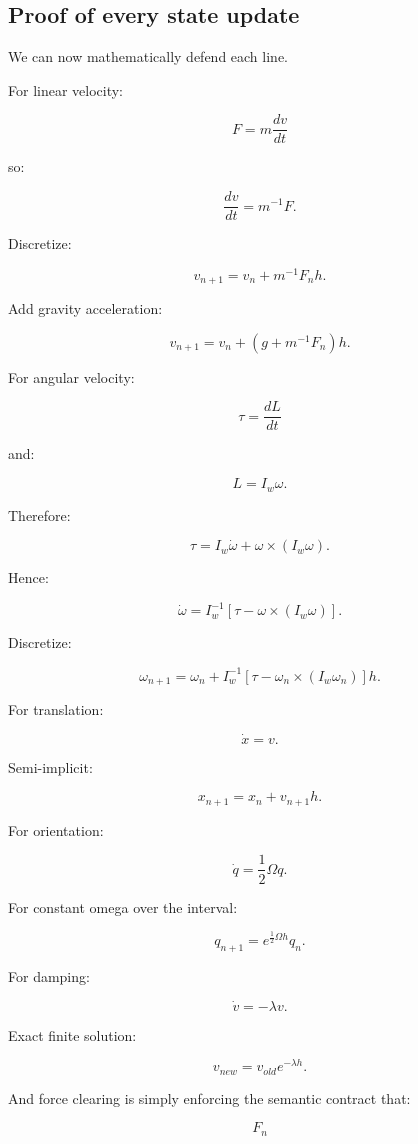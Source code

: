 \subsection{Proof of every state update}\label{06-engine-ii-ch039-proof-of-every-state-update}

We can now mathematically defend each line.

For linear velocity:

\[
F=m\frac{dv}{dt}
\]

so:

\[
\frac{dv}{dt}=m^{-1}F.
\]

Discretize:

\[
\boxed{
v_{n+1}
=
v_n+
m^{-1}F_nh.
}
\]

Add gravity acceleration:

\[
\boxed{
v_{n+1}
=
v_n+
(g+m^{-1}F_n)h.
}
\]

For angular velocity:

\[
\tau
=
\frac{dL}{dt}
\]

and:

\[
L=I_w\omega.
\]

Therefore:

\[
\tau
=
I_w\dot\omega+
\omega\times(I_w\omega).
\]

Hence:

\[
\boxed{
\dot\omega
=
I_w^{-1}
[
\tau-
\omega\times(I_w\omega)
].
}
\]

Discretize:

\[
\boxed{
\omega_{n+1}
=
\omega_n+
I_w^{-1}
[
\tau-
\omega_n\times(I_w\omega_n)
]h.
}
\]

For translation:

\[
\dot x=v.
\]

Semi-implicit:

\[
\boxed{
x_{n+1}
=
x_n+
v_{n+1}h.
}
\]

For orientation:

\[
\dot q
=
\frac12\Omega q.
\]

For constant omega over the interval:

\[
\boxed{
q_{n+1}
=
e^{\frac12\Omega h}
q_n.
}
\]

For damping:

\[
\dot v=-\lambda v.
\]

Exact finite solution:

\[
\boxed{
v_{new}
=
v_{old}e^{-\lambda h}.
}
\]

And force clearing is simply enforcing the semantic contract that:

\[
F_n
\]


